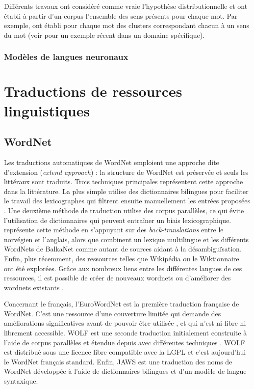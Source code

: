 Différents travaux ont considéré comme vraie l'hypothèse distributionnelle et
ont établi à partir d'un corpus l'ensemble des sens présents pour chaque mot.
Par exemple,
\cite{schutze1998automatic,pantel2002discovering,niu2007three,pedersen2010duluth}
ont établi pour chaque mot des clusters correspondant chacun à un sens du mot
(voir \cite{liu2012semantic} pour un exemple récent dans un domaine
spécifique).

\subsubsection{Modèles de langues neuronaux}

\section{Traductions de ressources linguistiques}
\label{sec:translation}

\subsection{WordNet}

Les traductions automatiques de WordNet emploient une approche dite d'extension
(\textit{extend approach}) : la structure de WordNet est préservée et seuls les
littéraux sont traduits. Trois techniques principales représentent cette
approche dans la littérature. La plus simple utilise des dictionnaires
bilingues pour faciliter le travail des lexicographes qui filtrent ensuite
manuellement les entrées proposées
\citep{vossen1998eurowordnet,pianta2002developing,tufis2004balkanet}. Une
deuxième méthode de traduction utilise des corpus parallèles, ce qui évite
l'utilisation de dictionnaires qui peuvent entraîner un biais lexicographique.
\cite{dyvik2004translations} représente cette méthode en s'appuyant sur des
\textit{back-translations} entre le norvégien et l'anglais, alors que
\citep{sagot2008construction} combinent un lexique multilingue et les
différents WordNets de BalkaNet comme autant de sources aidant à la
désambiguïsation. Enfin, plus récemment, des ressources telles que Wikipédia ou
le Wiktionnaire ont été explorées. Grâce aux nombreux liens entre les
différentes langues de ces ressources, il est possible de créer de nouveaux
wordnets \citep{demelo2009towards,navigli2010babelnet} ou d'améliorer des
wordnets existants \citep{hanoka2012wordnet}.

Concernant le français, l'EuroWordNet \citep{vossen1998eurowordnet} est la
première traduction française de WordNet. C'est une ressource d'une couverture
limitée qui demande des améliorations significatives avant de pouvoir être
utilisée \citep{jacquin2006systemes}, et qui n'est ni libre ni librement
accessible. WOLF est une seconde traduction initialement construite à l'aide de
corpus parallèles \citep{sagot2008construction} et étendue depuis avec
différentes techniques \citep{apidianaki2012applying}. WOLF est distribué sous
une licence libre compatible avec la LGPL et c'est aujourd'hui le WordNet
français standard. Enfin, JAWS \citep{mouton2010jaws} est une traduction des
noms de WordNet développée à l'aide de dictionnaires bilingues et d'un modèle
de langue syntaxique.

